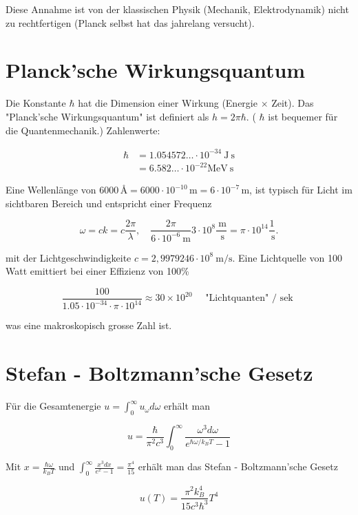 \documentclass[10pt, letterpaper]{article}
\begin{document}
Diese Annahme ist von der klassischen Physik (Mechanik, Elektrodynamik) nicht zu rechtfertigen (Planck selbst hat das jahrelang versucht).

\section*{Planck'sche Wirkungsquantum}
Die Konstante $\hbar$ hat die Dimension einer Wirkung (Energie $\times$ Zeit). Das "Planck'sche Wirkungsquantum" ist definiert als $h=2 \pi \hbar$. ( $\hbar$ ist bequemer für die Quantenmechanik.) Zahlenwerte:

$$
\begin{aligned}
\hbar & =1.054572 \ldots \cdot 10^{-34} \mathrm{~J} \mathrm{~s} \\
& =6.582 \ldots \cdot 10^{-22} \mathrm{MeV} \mathrm{~s}
\end{aligned}
$$

Eine Wellenlänge von $6000\,\text{\AA} = 6000 \cdot 10^{-10}\,\mathrm{m} = 6 \cdot 10^{-7}\,\mathrm{m}$, ist typisch für Licht im sichtbaren Bereich und entspricht einer Frequenz

$$
\omega=c k=c \frac{2 \pi}{\lambda}, \quad \frac{2 \pi}{6 \cdot 10^{-6} \mathrm{~m}} 3 \cdot 10^{8} \frac{\mathrm{~m}}{\mathrm{~s}}=\pi \cdot 10^{14} \frac{1}{\mathrm{~s}} .
$$

mit der Lichtgeschwindigkeite $c=2,9979246 \cdot 10^{8} \mathrm{~m} / \mathrm{s}$. Eine Lichtquelle von 100 Watt emittiert bei einer Effizienz von 100\%

$$
\frac{100}{1.05 \cdot 10^{-34} \cdot \pi \cdot 10^{14}} \approx 30 \times 10^{20} \quad \text { "Lichtquanten" } / \text { sek }
$$

was eine makroskopisch grosse Zahl ist.

\section*{Stefan - Boltzmann'sche Gesetz}
Für die Gesamtenergie $u=\int_{0}^{\infty} u_{\omega} d \omega$ erhält man

$$
u=\frac{\hbar}{\pi^{2} c^{3}} \int_{0}^{\infty} \frac{\omega^{3} d \omega}{e^{\hbar \omega / k_{B} T}-1}
$$

Mit $x=\frac{\hbar \omega}{k_{B} T}$ und $\int_{0}^{\infty} \frac{x^{3} d x}{e^{x}-1}=\frac{\pi^{4}}{15}$ erhält man das Stefan - Boltzmann'sche Gesetz

$$
u(T)=\frac{\pi^{2} k_{B}^{4}}{15 c^{3} \hbar^{3}} T^{4}
$$
\end{document}
